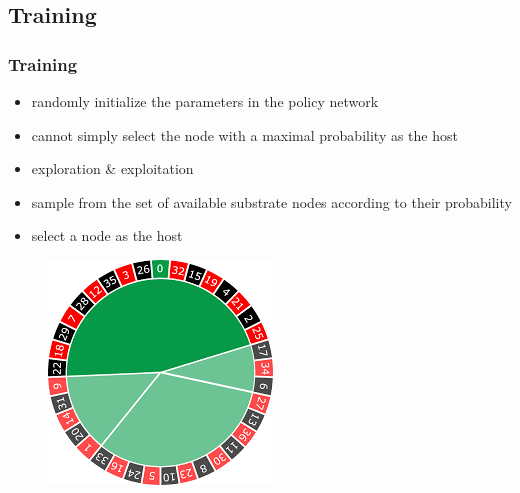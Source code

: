 \documentclass{beamer}
\begin{document}
\subsection{Training}
\begin{frame}
	\frametitle{Training}
	\begin{itemize}
		\item {randomly initialize the parameters in the policy network}
		\item{cannot simply select the node with a maximal probability as the host}
		\item {exploration \& exploitation}
		\item{ sample from the set
			of available substrate nodes according to their probability}
		\item {select a node as the
			host}
	\end{itemize}
\begin{figure}
	\centering
	\includegraphics[width=0.3\linewidth]{../Images/roletWheel}
	\label{fig:roletwheel}
\end{figure}
\end{frame}
\end{document}
